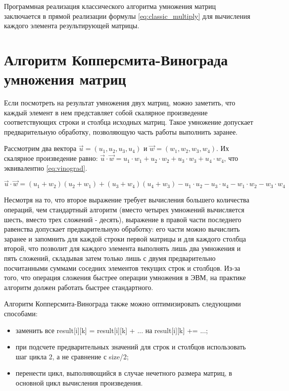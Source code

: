 \documentclass[12pt]{report}
\begin{document}
    Программная реализация классического алгоритма умножения матриц заключается
    в прямой реализации формулы \ref{eq:classic_multiply} для вычисления каждого элемента
    результирующей матрицы.


    \section{Алгоритм Копперсмита-Винограда умножения матриц}

    Если посмотреть на результат умножения двух матриц, можно заметить, что каждый элемент в нем
    представляет собой скалярное произведение соответствующих строки и столбца исходных матриц.
    Такое умножение допускает предварительную обработку, позволяющую часть работы выполнить заранее.

    Рассмотрим два вектора $\vec{u} = (u_1, u_2, u_3, u_4)$ и $\vec{w} = (w_1, w_2, w_3, w_4)$.
    Их скалярное произведение равно: $\vec{u} \cdot \vec{w} = u_1 \cdot w_1 + u_2 \cdot w_2 + u_3 \cdot w_3 +
    u_4 \cdot w_4$, что эквивалентно \ref{eq:vinograd}.

    \begin{equation}
        \label{eq:vinograd}
        \vec{u} \cdot \vec{w} = (u_1 + w_2)(u_2 + w_1) + (u_3 + w_4)(u_4 + w_3)
        - u_1 \cdot u_2 - u_3 \cdot u_4 - w_1 \cdot w_2 - w_3 \cdot w_4
    \end{equation}

    Несмотря на то, что второе выражение требует вычисления большего количества операций,
    чем стандартный алгоритм (вместо четырех умножений вычисляется шесть, вместо трех сложений - десять),
    выражение в правой части последнего равенства допускает предварительную обработку:
    его части можно вычислить заранее и запомнить для каждой строки первой матрицы
    и для каждого столбца второй, что позволит для каждого элемента выполнять лишь два умножения
    и пять сложений, складывая затем только лишь с двумя предварительно
    посчитанными суммами соседних элементов текущих строк и столбцов.
    Из-за того, что операция сложения быстрее операции умножения в ЭВМ,
    на практике алгоритм должен работать быстрее стандартного.
    
    Алгоритм Копперсмита-Винограда также можно оптимизировать следующими способами:
    \begin{itemize}
    	\item заменить все result{[i][k]} = result{[i][k]} + ... на result{[i][k]} += ...;
    	\item при подсчете предварительных значений для строк и столбцов использовать шаг цикла
    	2, а не сравнение с size/2;
    	\item перенести цикл, выполняющийся в случае нечетного размера матриц, в основной цикл вычисления произведения.
    \end{itemize}    
\end{document}
